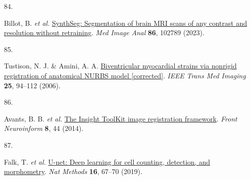 \documentclass[
  12pt,
]{article}
\newlength{\cslhangindent}
\newlength{\csllabelwidth}
\newenvironment{CSLReferences}[2] %
 {\begin{list}{}{%
  \setlength{\itemindent}{0pt}
  \setlength{\leftmargin}{0pt}
  \setlength{\parsep}{0pt}
  \ifodd #1
   \setlength{\leftmargin}{\cslhangindent}
   \setlength{\itemindent}{-1\cslhangindent}
  \fi
  \setlength{\itemsep}{#2\baselineskip}}}
 {\end{list}}
\newcommand{\CSLLeftMargin}[1]{\parbox[t]{\csllabelwidth}{\strut#1\strut}}
\newcommand{\CSLRightInline}[1]{\parbox[t]{\linewidth - \csllabelwidth}{\strut#1\strut}}
\begin{document}
\begin{CSLReferences}{0}{0}
\CSLLeftMargin{84. }%
\CSLRightInline{Billot, B. \emph{et al.}
\href{https://doi.org/10.1016/j.media.2023.102789}{SynthSeg:
Segmentation of brain MRI scans of any contrast and resolution without
retraining}. \emph{Med Image Anal} \textbf{86}, 102789 (2023).}

\CSLLeftMargin{85. }%
\CSLRightInline{Tustison, N. J. \& Amini, A. A.
\href{https://doi.org/10.1109/TMI.2005.861015}{Biventricular myocardial
strains via nonrigid registration of anatomical {NURBS} model
{[}corrected{]}}. \emph{IEEE Trans Med Imaging} \textbf{25}, 94--112
(2006).}

\CSLLeftMargin{86. }%
\CSLRightInline{Avants, B. B. \emph{et al.}
\href{https://doi.org/10.3389/fninf.2014.00044}{The {Insight} {ToolKit}
image registration framework}. \emph{Front Neuroinform} \textbf{8}, 44
(2014).}

\CSLLeftMargin{87. }%
\CSLRightInline{Falk, T. \emph{et al.}
\href{https://doi.org/10.1038/s41592-018-0261-2}{U-net: Deep learning
for cell counting, detection, and morphometry}. \emph{Nat Methods}
\textbf{16}, 67--70 (2019).}

\end{CSLReferences}
\end{document}
